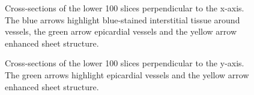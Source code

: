    \begin{figure}
      \centering
      \caption{Cross-sections of the lower 100 slices perpendicular to the x-axis. The blue arrows highlight blue-stained interstitial tissue around vessels, the green arrow epicardial vessels and the yellow arrow enhanced sheet structure.}
      \label{fig:adjusted_bottom_vessels_0_235}
    \end{figure}

    \begin{figure}
      \centering
      \caption{Cross-sections of the lower 100 slices perpendicular to the y-axis. The green arrows highlight epicardial vessels and the yellow arrow enhanced sheet structure.}
      \label{fig:adjusted_bottom_vessels_1_287}
    \end{figure}
    
